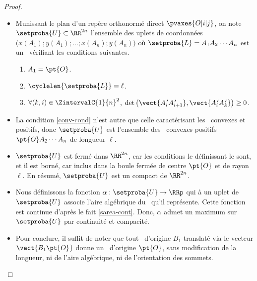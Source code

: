 \begin{proof}
	\leavevmode
	\begin{itemize}
        \item Munissant le plan d'un repère orthonormé direct $\pvaxes{O | i | j}$, 
	    on note $\setproba{U} \subset \RR^{2n}$ l'ensemble des uplets de coordonnées $\big( x(A_1) ; y(A_1) ; \dots ; x(A_n) ; y(A_n) \big)$ où $\setproba{L} = A_1 A_2 \cdots A_n$ est un \ncycle\ vérifiant les conditions suivantes.
	    \begin{enumerate}
	    	\item $A_1 = \pt{O}$.

	    	\item $\cyclelen{\setproba{L}} = \ell$.

		    \item \label{conv-cond}
		    $\forall (k, i) \in \ZintervalC{1}{n}^2$,
		    $\det \big( \vect{A^{\,\prime}_i A^{\,\prime}_{i+1}}, \vect{A^{\,\prime}_i A^{\,\prime}_k} \big) \geq 0$.
	    \end{enumerate}


        \item La condition \ref{conv-cond} n'est autre que celle caractérisant les \ncycles\ convexes et positifs,
        donc $\setproba{U}$ est l'ensemble des \ncycles\ convexes positifs $\pt{O} A_2 \cdots A_n$ de longueur $\ell$.


        \item $\setproba{U}$ est fermé dans $\RR^{2n}$, car les conditions le définissant le sont, et il est borné, car inclus dans la boule fermée de centre $\pt{O}$ et de rayon $\ell$.
        En résumé, $\setproba{U}$ est un compact de $\RR^{2n}$.


        \item Nous définissons la fonction $\alpha: \setproba{U} \rightarrow \RRp$ qui à un uplet de $\setproba{U}$ associe l'aire algébrique du \ncycle\ qu'il représente.
        Cette fonction est continue d'après le fait \ref{sarea-cont}.
        Donc, $\alpha$ admet un maximum sur $\setproba{U}$ par continuité et compacité.


        \item Pour conclure, il suffit de noter que tout \ncycle\ d'origine $B_1$ translaté via le vecteur $\vect{B_1 \pt{O}}$ donne un \ncycle\ d'origine $\pt{O}$, sans modification de la longueur, ni de l'aire algébrique, ni de l'orientation des sommets.
    \end{itemize}
	
	\null\vspace{-6ex}
\end{proof}
